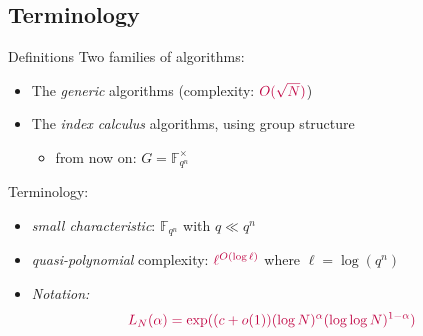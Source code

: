 \documentclass[xcolor=x11names,compress]{beamer}
\theoremstyle{break}
\theoremstyle{sc}
\theoremstyle{definition}
\theoremstyle{remark}
\begin{document}
\subsection{Terminology}
\begin{frame}{Definitions}
  Two families of algorithms:
  \begin{itemize}
    \item The \emph{generic} algorithms (complexity:
      $\textcolor{purple}{O(\sqrt N)}$)
    \item The \emph{index calculus} algorithms, using group structure
      \begin{itemize}
        \item from now on: $G=\mathbb{F}_{q^n}^\times$
      \end{itemize}
    \end{itemize}
    Terminology:
    \begin{itemize}
      \item \emph{small characteristic}: $\mathbb{F}_{q^n}$ with $q\ll q^n$
    \item \emph{quasi-polynomial} complexity:
      $\textcolor{purple}{\ell^{O(\log\ell)}}$ where $\ell=\log(q^n)$
      \item \emph{Notation:}
  \[
    \textcolor{purple}{L_N(\alpha) = \exp((c+o(1))(\log N)^\alpha(\log\log
      N)^{1-\alpha})}
  \]


  \end{itemize}
\end{frame}
\end{document}
